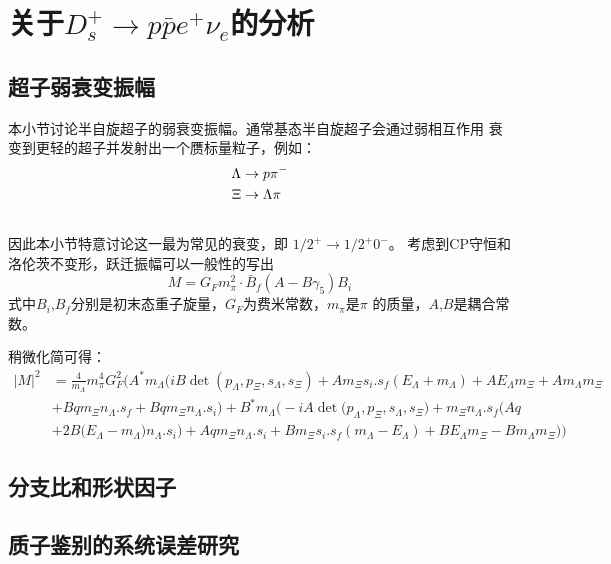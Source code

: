 %
%

\chapter{关于$D_{s}^{+} \to p \bar{p} e^{+} \nu_{e}$的分析}
\section{超子弱衰变振幅}
本小节讨论半自旋超子的弱衰变振幅。通常基态半自旋超子会通过弱相互作用
衰变到更轻的超子并发射出一个赝标量粒子，例如：
\begin{equation}
    \begin{aligned}
        \label{eq:}
        \Lambda &\to p \pi^{-} \\ \notag
        \Xi &\to \Lambda \pi \\ \notag
    \end{aligned}
\end{equation}
因此本小节特意讨论这一最为常见的衰变，即 $1/2^{+} \to 1/2^{+} 0^{-}$。
考虑到CP守恒和洛伦茨不变形，跃迁振幅可以一般性的写出
\begin{equation}
    M = G_{F} m^{2}_{\pi} \cdot \bar{B}_{f} \left(A-B\gamma_{5}\right) B_{i}
\end{equation}
式中$B_{i}$,$B_{f}$分别是初末态重子旋量，$G_{F}$为费米常数，$m_{\pi}$是$\pi$
的质量，$A$,$B$是耦合常数。

稍微化简可得：
\begin{equation}
    \begin{aligned}
        \label{eq:}
        |M|^{2}& =   \frac{4}{m_{\Lambda}}
    m_{\pi}^4 G_F^2 \Bigg(A^* m_{\Lambda} \bigg(i B \det
   \left(p_{\Lambda},p_{\Xi},s_{\Lambda},s_{\Xi}\right)+A
   m_{\Xi} s_i.s_f \left(E_{\Lambda}+m_{\Lambda}\right)+A
   E_{\Lambda} m_{\Xi}+A m_{\Lambda} m_{\Xi} \\
        &+B q m_{\Xi} n_{\Lambda }.s_f
        +B q m_{\Xi } n_{\Lambda }.s_i\bigg)
        + B^*m_{\Lambda } \bigg(-i A \det \big(p_{\Lambda },p_{\Xi
   },s_{\Lambda },s_{\Xi }\big)+m_{\Xi } n_{\Lambda }.s_f
   \Big(A q \\ 
        &+2 B \big(E_{\Lambda }-m_{\Lambda }\big)
   n_{\Lambda }.s_i \Big)
        +A q m_{\Xi } n_{\Lambda }.s_i+B
   m_{\Xi } s_i.s_f \left(m_{\Lambda }-E_{\Lambda }\right)+B
   E_{\Lambda } m_{\Xi }-B m_{\Lambda } m_{\Xi
   }\bigg)\Bigg)
    \end{aligned}
\end{equation}


\section{分支比和形状因子}
\section{质子鉴别的系统误差研究}



